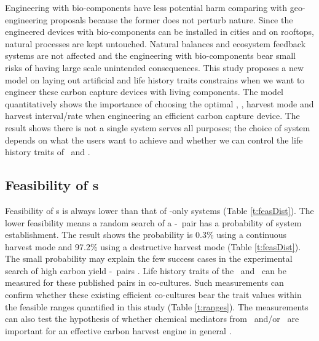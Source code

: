 \documentclass[../thesis.tex]{subfiles} %
\begin{document}
Engineering with bio-components have less potential harm comparing with geo-engineering proposals because the former does not perturb nature.  Since the engineered devices with bio-components can be installed in cities and on rooftops, natural processes are kept untouched.  Natural balances and ecosystem feedback systems are not affected and the engineering with bio-components bear small risks of having large scale unintended consequences.  This study proposes a new model on laying out artificial and life history traits constrains when we want to engineer these carbon capture devices with living components.  The model quantitatively shows the importance of choosing the optimal \phy, \bac, harvest mode and harvest interval/rate when engineering an efficient carbon capture device.  The result shows there is not a single system serves all purposes; the choice of system depends on what the users want to achieve and whether we can control the life history traits of \phy\ and \bac.

\subsection{Feasibility of \pbs s}
Feasibility of \pbs s is always lower than that of \phy-only systems (Table \ref{t:feasDist}).  The lower feasibility means a random search of a \phy-\bac\ pair has a probability of system establishment.  The result shows the probability is 0.3\% using a continuous harvest mode and 97.2\% using a destructive harvest mode (Table \ref{t:feasDist}).  The small probability may explain the few success cases in the experimental search of high carbon yield \phy-\bac\ pairs \autocite{fuentes2016impact}.  Life history traits of the \phy\ and \bac\ can be measured for these published pairs in co-cultures.  Such measurements can confirm whether these existing efficient co-cultures bear the trait values within the feasible ranges quantified in this study (Table \ref{t:ranges}).  The measurements can also test the hypothesis of whether chemical mediators from \phy\ and/or \bac\ are important for an effective carbon harvest engine in general \autocite{rivas2010interactions,amin2009photolysis,fuentes2016impact}.
\end{document}
